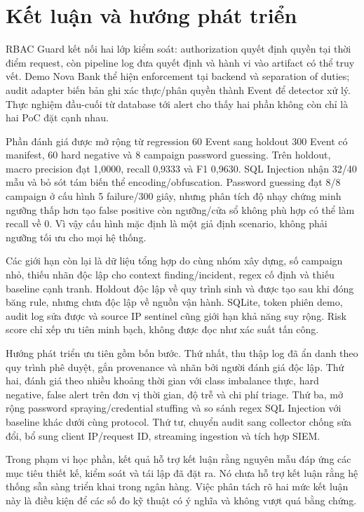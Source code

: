 \chapter{Kết luận và hướng phát triển}

RBAC Guard kết nối hai lớp kiểm soát: authorization quyết định quyền tại thời
điểm request, còn pipeline log đưa quyết định và hành vi vào artifact có thể
truy vết. Demo Nova Bank thể hiện enforcement tại backend và separation of
duties; audit adapter biến bản ghi xác thực/phân quyền thành Event để detector
xử lý. Thực nghiệm đầu-cuối từ database tới alert cho thấy hai phần không còn
chỉ là hai PoC đặt cạnh nhau.

Phần đánh giá được mở rộng từ regression 60 Event sang holdout 300 Event có
manifest, 60 hard negative và 8 campaign password guessing. Trên holdout,
macro precision đạt 1,0000, recall 0,9333 và F1 0,9630. SQL Injection nhận
32/40 mẫu và bỏ sót tám biến thể encoding/obfuscation. Password guessing đạt
8/8 campaign ở cấu hình 5 failure/300 giây, nhưng phân tích độ nhạy chứng minh
ngưỡng thấp hơn tạo false positive còn ngưỡng/cửa sổ không phù hợp có thể làm
recall về 0. Vì vậy cấu hình mặc định là một giả định scenario, không phải
ngưỡng tối ưu cho mọi hệ thống.

Các giới hạn còn lại là dữ liệu tổng hợp do cùng nhóm xây dựng, số campaign
nhỏ, thiếu nhãn độc lập cho context finding/incident, regex cố định và thiếu
baseline cạnh tranh. Holdout độc lập về quy trình sinh và được tạo sau khi đóng
băng rule, nhưng chưa độc lập về nguồn vận hành. SQLite, token phiên demo,
audit log sửa được và source IP sentinel cũng giới hạn khả năng suy rộng. Risk
score chỉ xếp ưu tiên minh bạch, không được đọc như xác suất tấn công.

Hướng phát triển ưu tiên gồm bốn bước. Thứ nhất, thu thập log đã ẩn danh theo
quy trình phê duyệt, gắn provenance và nhãn bởi người đánh giá độc lập. Thứ hai,
đánh giá theo nhiều khoảng thời gian với class imbalance thực, hard negative,
false alert trên đơn vị thời gian, độ trễ và chi phí triage. Thứ ba, mở rộng
password spraying/credential stuffing và so sánh regex SQL Injection với
baseline khác dưới cùng protocol. Thứ tư, chuyển audit sang collector chống
sửa đổi, bổ sung client IP/request ID, streaming ingestion và tích hợp SIEM.

Trong phạm vi học phần, kết quả hỗ trợ kết luận rằng nguyên mẫu đáp ứng các mục
tiêu thiết kế, kiểm soát và tái lập đã đặt ra. Nó chưa hỗ trợ kết luận rằng hệ
thống sẵn sàng triển khai trong ngân hàng. Việc phân tách rõ hai mức kết luận
này là điều kiện để các số đo kỹ thuật có ý nghĩa và không vượt quá bằng chứng.
